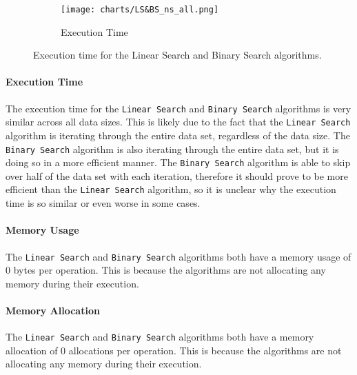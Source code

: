 \begin{figure}[H]
    \centering
    \begin{subfigure}[b]{0.75\textwidth}
        \texttt{[image: charts/LS\&BS\_ns\_all.png]}
        \caption{Execution Time}
        \label{fig:linear-search-binary-search-execution-time}
    \end{subfigure}

    \caption{Execution time for the Linear Search and Binary Search algorithms.}
    \label{fig:linear-search-binary-search-performance-metrics}
\end{figure}

\paragraph{Execution Time}
The execution time for the \lstinline{Linear Search} and \lstinline{Binary Search} algorithms is very similar across all data sizes. This is likely due to the fact that the \lstinline{Linear Search} algorithm is iterating through the entire data set, regardless of the data size. The \lstinline{Binary Search} algorithm is also iterating through the entire data set, but it is doing so in a more efficient manner. The \lstinline{Binary Search} algorithm is able to skip over half of the data set with each iteration, therefore it should prove to be more efficient than the \lstinline{Linear Search} algorithm, so it is unclear why the execution time is so similar or even worse in some cases.

\paragraph{Memory Usage}
The \lstinline{Linear Search} and \lstinline{Binary Search} algorithms both have a memory usage of 0 bytes per operation. This is because the algorithms are not allocating any memory during their execution.

\paragraph{Memory Allocation}
The \lstinline{Linear Search} and \lstinline{Binary Search} algorithms both have a memory allocation of 0 allocations per operation. This is because the algorithms are not allocating any memory during their execution.

\newpage

